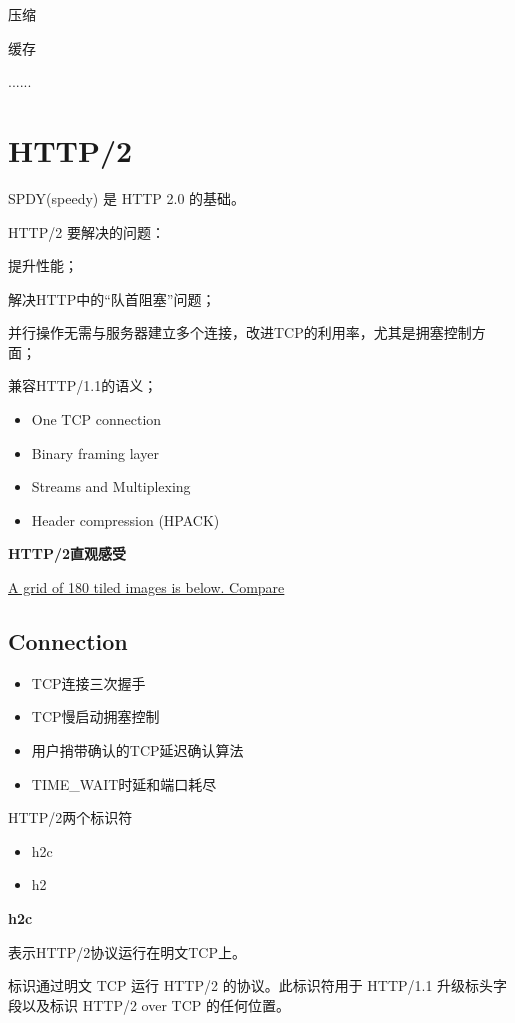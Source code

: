 压缩

缓存

......


\section{HTTP/2}


SPDY(speedy) 是 HTTP 2.0 的基础。

HTTP/2 要解决的问题：

提升性能；

解决HTTP中的“队首阻塞”问题；

并行操作无需与服务器建立多个连接，改进TCP的利用率，尤其是拥塞控制方面；

兼容HTTP/1.1的语义；



\begin{itemize}
    \item One TCP connection
    \item Binary framing layer
    \item Streams and Multiplexing
    \item Header compression (HPACK)
\end{itemize}


\textbf{HTTP/2直观感受}


\href{https://http2.golang.org/gophertiles}{A grid of 180 tiled images is below. Compare}

\subsection{Connection}


\begin{itemize}
    \item   TCP连接三次握手 
    \item   TCP慢启动拥塞控制
    \item   用户捎带确认的TCP延迟确认算法
    \item   TIME\_WAIT时延和端口耗尽
\end{itemize}


HTTP/2两个标识符

\begin{itemize}
    \item h2c
    \item h2
\end{itemize}  

\textbf{h2c}

表示HTTP/2协议运行在明文TCP上。

标识通过明文 TCP 运行 HTTP/2 的协议。此标识符用于 HTTP/1.1 升级标头字段以及标识 HTTP/2 over TCP 的任何位置。

